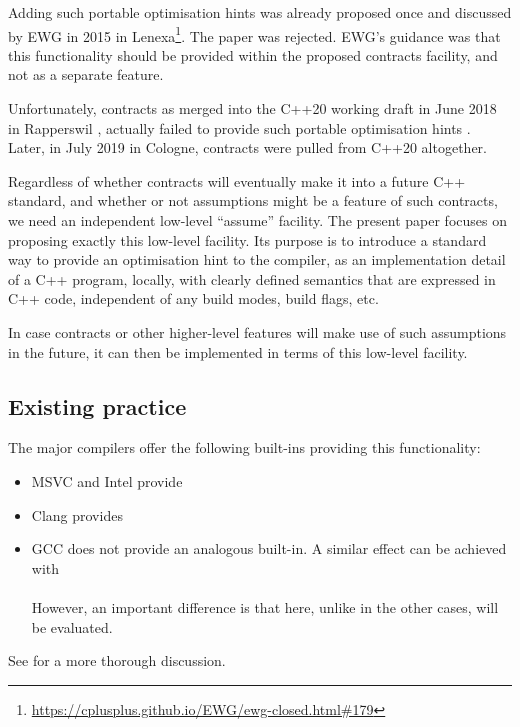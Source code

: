Adding such portable optimisation hints was already proposed once \cite{N4425} and discussed by EWG in 2015 in Lenexa\footnote{\url{https://cplusplus.github.io/EWG/ewg-closed.html\#179}}. The paper was rejected. EWG's guidance was that this functionality should be provided within the proposed contracts facility, and not as a separate feature.

Unfortunately, contracts as merged into the C++20 working draft in June 2018 in Rapperswil \cite{P0542R5}, actually failed to provide such portable optimisation hints \cite{P1773R0}. Later, in July 2019 in Cologne, contracts were pulled from C++20 altogether.

Regardless of whether contracts will eventually make it into a future C++ standard, and whether or not assumptions might be a feature of such contracts, we need an independent low-level ``assume'' facility.  The present paper focuses on proposing exactly this low-level facility. Its purpose is to introduce a standard way to provide an optimisation hint to the compiler, as an implementation detail of a C++ program, locally, with clearly defined semantics that are expressed in C++ code, independent of any build modes, build flags, etc.

In case contracts or other higher-level features will make use of such assumptions in the future, it can then be implemented in terms of this low-level facility.

\subsection{Existing practice}

The major compilers offer the following built-ins providing this functionality:
\begin{itemize}
\item MSVC and Intel provide 
\item Clang provides 
\item GCC does not provide an analogous built-in. A similar effect can be achieved with \\
  \\
However, an important difference is that here, unlike in the other cases,  will be evaluated.
\end{itemize}
See \cite{N4425} for a more thorough discussion.

